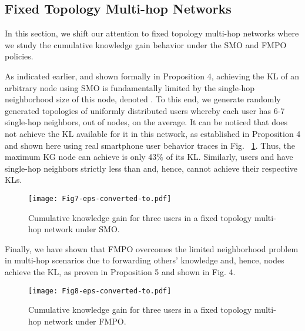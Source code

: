 \documentclass[conference]{IEEEtran}
\theoremstyle{definition}
\begin{document}
\subsection{Fixed Topology Multi-hop Networks}
\vspace{-0.1 cm}

In this section, we shift our attention to fixed topology multi-hop networks 
where we study the cumulative knowledge gain behavior under the SMO and FMPO policies.

As indicated earlier, and shown formally in Proposition 4, achieving the KL of an arbitrary node using SMO is fundamentally limited by the single-hop neighborhood size of this node, denoted .
To this end, we generate  randomly generated topologies of uniformly distributed users whereby each user has 6-7 single-hop neighbors, out of  nodes, on the average. It can be noticed that  
does not achieve the KL available for it in this network, as established in Proposition 4 and shown here using real smartphone user behavior traces in Fig. ~\ref{fig:B00_SMHOP)}. Thus, the maximum KG node  can achieve is only 43\% of its KL. Similarly, users  and  have single-hop neighbors strictly less than  and, hence, cannot achieve their respective KLs. 
\begin{figure}[!bp]
\centerline{\texttt{[image: Fig7-eps-converted-to.pdf]}}
\caption{Cumulative knowledge gain for three users in a fixed topology multi-hop network under SMO.}\label{fig:B00_SMHOP)}
\end{figure} 




Finally, we have shown that FMPO overcomes the limited neighborhood problem in multi-hop scenarios due to forwarding others' knowledge and, hence, nodes achieve the KL, as proven in Proposition 5 and shown in Fig. 4. 


\begin{figure}[!bp]
\centerline  {   \texttt{[image: Fig8-eps-converted-to.pdf]}}
\caption{Cumulative knowledge gain for three users in a fixed topology multi-hop network under FMPO.}\label{fig:B00_SMHOP_MO)}
\end{figure}
\end{document}

